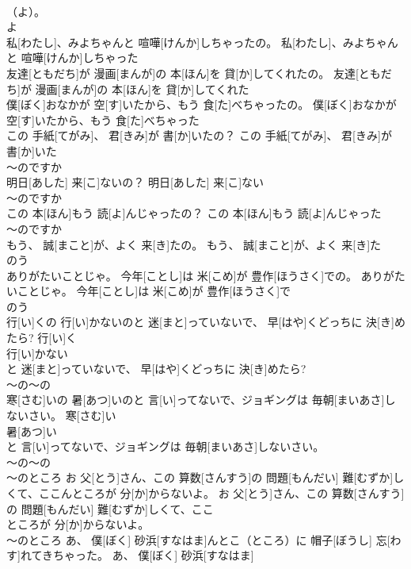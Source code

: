 \documentclass[8pt]{extreport}
\begin{document}
\begin{CJK}{UTF8}{min}
\\	（よ）。	
\\	よ 
\\	私[わたし]、みよちゃんと 喧嘩[けんか]しちゃったの。	私[わたし]、みよちゃんと 喧嘩[けんか]しちゃった
\\	友達[ともだち]が 漫画[まんが]の 本[ほん]を 貸[か]してくれたの。	友達[ともだち]が 漫画[まんが]の 本[ほん]を 貸[か]してくれた
\\	僕[ぼく]おなかが 空[す]いたから、もう 食[た]べちゃったの。	僕[ぼく]おなかが 空[す]いたから、もう 食[た]べちゃった
\\	この 手紙[てがみ]、 君[きみ]が 書[か]いたの？	この 手紙[てがみ]、 君[きみ]が 書[か]いた
\\	～のですか 
\\	明日[あした] 来[こ]ないの？	明日[あした] 来[こ]ない
\\	～のですか 
\\	この 本[ほん]もう 読[よ]んじゃったの？	この 本[ほん]もう 読[よ]んじゃった
\\	～のですか 
\\	もう、 誠[まこと]が、よく 来[き]たの。	もう、 誠[まこと]が、よく 来[き]た
\\	のう 
\\	ありがたいことじゃ。 今年[ことし]は 米[こめ]が 豊作[ほうさく]での。	ありがたいことじゃ。 今年[ことし]は 米[こめ]が 豊作[ほうさく]で
\\	のう 
\\	行[い]くの 行[い]かないのと 迷[まと]っていないで、 早[はや]くどっちに 決[き]めたら?	行[い]く
\\	行[い]かない
\\	と 迷[まと]っていないで、 早[はや]くどっちに 決[き]めたら?	
\\	～の～の
\\	寒[さむ]いの 暑[あつ]いのと 言[い]ってないで、ジョギングは 毎朝[まいあさ]しないさい。	寒[さむ]い
\\	暑[あつ]い
\\	と 言[い]ってないで、ジョギングは 毎朝[まいあさ]しないさい。	
\\	～の～の
\\	～のところ	お 父[とう]さん、この 算数[さんすう]の 問題[もんだい] 難[むずか]しくて、ここんところが 分[か]からないよ。	お 父[とう]さん、この 算数[さんすう]の 問題[もんだい] 難[むずか]しくて、ここ
\\	ところが 分[か]からないよ。	
\\	～のところ	あ、 僕[ぼく] 砂浜[すなはま]んとこ（ところ）に 帽子[ぼうし] 忘[わす]れてきちゃった。	あ、 僕[ぼく] 砂浜[すなはま]

\end{CJK}
\end{document}
